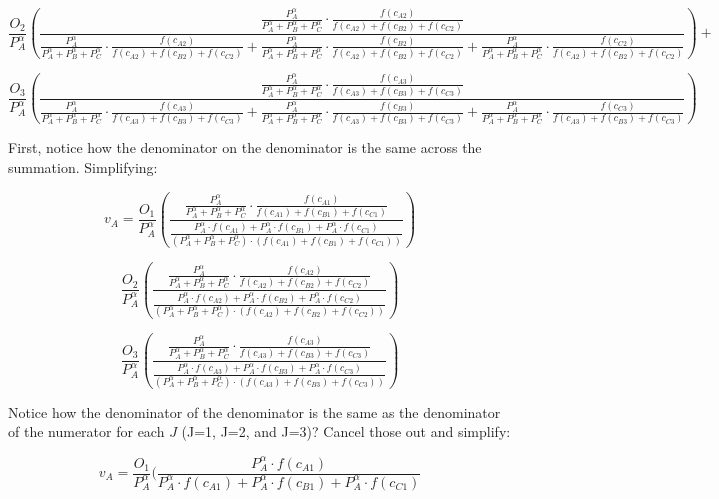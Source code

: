 \documentclass[]{elsarticle} %
\begin{document}
\[
\frac{O_2}{P_{A}^\alpha}(\frac{\frac{P_{A}^\alpha}{P_{A}^\alpha+P_{B}^\alpha+P_{C}^\alpha} \cdot \frac{f(c_{A2})}{f(c_{A2})+f(c_{B2})+f(c_{C2})}}{\frac{P_{A}^\alpha}{P_{A}^\alpha+P_{B}^\alpha+P_{C}^\alpha} \cdot \frac{f(c_{A2})}{f(c_{A2})+f(c_{B2})+f(c_{C2})} + \frac{P_{A}^\alpha}{P_{A}^\alpha+P_{B}^\alpha+P_{C}^\alpha} \cdot \frac{f(c_{B2})}{f(c_{A2})+f(c_{B2})+f(c_{C2})}+\frac{P_{A}^\alpha}{P_{A}^\alpha+P_{B}^\alpha+P_{C}^\alpha} \cdot \frac{f(c_{C2})}{f(c_{A2})+f(c_{B2})+f(c_{C2})}} )+
\]

\[
\frac{O_3}{P_{A}^\alpha}(\frac{\frac{P_{A}^\alpha}{P_{A}^\alpha+P_{B}^\alpha+P_{C}^\alpha} \cdot \frac{f(c_{A3})}{f(c_{A3})+f(c_{B3})+f(c_{C3})}}{\frac{P_{A}^\alpha}{P_{A}^\alpha+P_{B}^\alpha+P_{C}^\alpha} \cdot \frac{f(c_{A3})}{f(c_{A3})+f(c_{B3})+f(c_{C3})} + \frac{P_{A}^\alpha}{P_{A}^\alpha+P_{B}^\alpha+P_{C}^\alpha} \cdot \frac{f(c_{B3})}{f(c_{A3})+f(c_{B3})+f(c_{C3})}+\frac{P_{A}^\alpha}{P_{A}^\alpha+P_{B}^\alpha+P_{C}^\alpha} \cdot \frac{f(c_{C3})}{f(c_{A3})+f(c_{B3})+f(c_{C3})}} )
\]

First, notice how the denominator on the denominator is the same across
the summation. Simplifying:

\[
v_{A} = \frac{O_1}{P_{A}^\alpha}(\frac{\frac{P_{A}^\alpha}{P_{A}^\alpha+P_{B}^\alpha+P_{C}^\alpha} \cdot \frac{f(c_{A1})}{f(c_{A1})+f(c_{B1})+f(c_{C1})}}{\frac{P_{A}^\alpha \cdot f(c_{A1}) + P_{A}^\alpha \cdot f(c_{B1}) + P_{A}^\alpha \cdot f(c_{C1})}{(P_{A}^\alpha+P_{B}^\alpha+P_{C}^\alpha) \cdot (f(c_{A1})+f(c_{B1})+f(c_{C1}))}})
\]

\[\frac{O_2}{P_{A}^\alpha}(\frac{\frac{P_{A}^\alpha}{P_{A}^\alpha+P_{B}^\alpha+P_{C}^\alpha} \cdot \frac{f(c_{A2})}{f(c_{A2})+f(c_{B2})+f(c_{C2})}}{\frac{P_{A}^\alpha \cdot f(c_{A2}) + P_{A}^\alpha \cdot f(c_{B2}) + P_{A}^\alpha \cdot f(c_{C2})}{(P_{A}^\alpha+P_{B}^\alpha+P_{C}^\alpha) \cdot (f(c_{A2})+f(c_{B2})+f(c_{C2}))}})
\]

\[
\frac{O_3}{P_{A}^\alpha}(\frac{\frac{P_{A}^\alpha}{P_{A}^\alpha+P_{B}^\alpha+P_{C}^\alpha} \cdot \frac{f(c_{A3})}{f(c_{A3})+f(c_{B3})+f(c_{C3})}}{\frac{P_{A}^\alpha \cdot f(c_{A3}) + P_{A}^\alpha \cdot f(c_{B3}) + P_{A}^\alpha \cdot f(c_{C3})}{(P_{A}^\alpha+P_{B}^\alpha+P_{C}^\alpha) \cdot (f(c_{A3})+f(c_{B3})+f(c_{C3}))}} )
\]

Notice how the denominator of the denominator is the same as the
denominator of the numerator for each \(J\) (J=1, J=2, and J=3)? Cancel
those out and simplify:

\[
v_{A} = \frac{O_1}{P_{A}^\alpha}(\frac{P_{A}^\alpha \cdot f(c_{A1})}{P_{A}^\alpha \cdot f(c_{A1}) + P_{A}^\alpha \cdot f(c_{B1}) + P_{A}^\alpha \cdot f(c_{C1})}
\]
\end{document}
